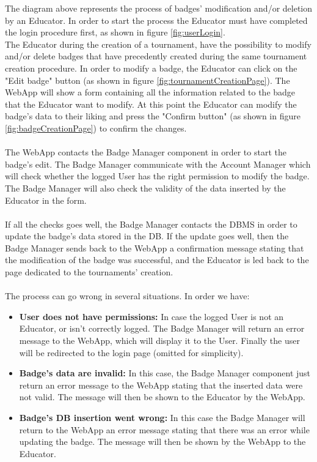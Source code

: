 \documentclass{article}
\begin{document}
{        The diagram above represents the process of badges' modification and/or deletion by an 
        Educator. In order to start the process the Educator must have completed the login 
        procedure first, as shown in figure \ref{fig:userLogin}. \\
        The Educator during the creation of a tournament, have the possibility to modify and/or
        delete badges that have precedently created during the same tournament creation procedure.
        In order to modify a badge, the Educator can click on the "Edit badge" button 
        (as shown in figure \ref{fig:tournamentCreationPage}). The WebApp will show a form 
        containing all the information related to the badge that the Educator want to modify.
        At this point the Educator can modify the badge's data to their liking and press the
        "Confirm button" (as shown in figure \ref{fig:badgeCreationPage}) to confirm the changes.
        \\ \\
        The WebApp contacts the Badge Manager component in order to start the badge's edit.
        The Badge Manager communicate with the Account Manager which will check whether the 
        logged User has the right permission to modify the badge. The Badge Manager will also
        check the validity of the data inserted by the Educator in the form.
        \\ \\
        If all the checks goes well, the Badge Manager contacts the DBMS in order to update the
        badge's data stored in the DB.
        If the update goes well, then the Badge Manager sends back to the WebApp a confirmation
        message stating that the modification of the badge was successful, and the Educator 
        is led back to the page dedicated to the tournaments' creation.
        \\ \\
        The process can go wrong in several situations. In order we have:
        \begin{itemize}
            \item \textbf{User does not have permissions:} In case the logged User is not an
            Educator, or isn't correctly logged. The Badge Manager will return an
            error message to the WebApp, which will display it to the User.
            Finally the user will be redirected to the login page (omitted for simplicity).
            \item \textbf{Badge's data are invalid:} In this case, the Badge Manager component 
            just return an error message to the WebApp stating that the inserted data were not 
            valid. The message will then be shown to the Educator by the WebApp.
            \item \textbf{Badge's DB insertion went wrong:} In this case the Badge Manager will 
            return to the WebApp an error message stating that there was an error while updating 
            the badge. The message will then be shown by the WebApp to the Educator.
        \end{itemize}


}
\end{document}
